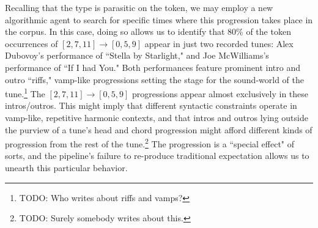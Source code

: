 \begin{enumerate}
Recalling that the type is parasitic on the token, we may employ a new algorithmic agent to search for specific times where this progression takes place in the corpus.  In this case, doing so allows us to identify that 80\% of the token occurrences of $[2,7,11] \rightarrow [0,5,9]$ appear in just two recorded tunes: Alex Dubovoy's performance of ``Stella by Starlight," and Joe McWilliams's performance of ``If I had You."  Both performances feature prominent intro and outro ``riffs," vamp-like progressions setting the stage for the sound-world of the tune.\footnote{TODO: Who writes about riffs and vamps?}  The $[2,7,11] \rightarrow [0,5,9]$ progressions appear almost exclusively in these intros/outros.  This might imply that different syntactic constraints operate in vamp-like, repetitive harmonic contexts, and that intros and outros lying outside the purview of a tune's head and chord progression might afford different kinds of progression from the rest of the tune.\footnote{TODO: Surely somebody writes about this.}  The progression is a ``special effect" of sorts, and the pipeline's failure to re-produce traditional expectation allows us to unearth this particular behavior.


\end{enumerate}
